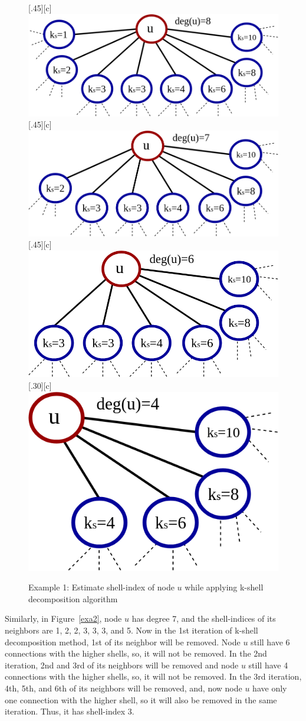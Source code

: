 \documentclass[12pt,3p]{article}
\begin{document}
\begin{figure}[htp]
  \centering
  [.45\linewidth][c]{%
    \includegraphics[width=.45\linewidth]{images/kshell_example1_itr0}}\quad
  [.45\linewidth][c]{%
    \includegraphics[width=.45\linewidth]{images/kshell_example1_itr1.png}}
  [.45\linewidth][c]{%
    \includegraphics[width=.45\linewidth]{images/kshell_example1_itr2}}\quad
  [.30\linewidth][c]{%
    \includegraphics[width=.30\linewidth]{images/kshell_example1_itr3.png}}
  \caption{Example 1: Estimate shell-index of node $u$ while applying k-shell decomposition algorithm}
  \label{exa1}
\end{figure}

Similarly, in Figure~\ref{exa2}, node $u$ has degree 7, and the shell-indices of its neighbors are 1, 2, 2, 3, 3, 3, and 5. Now in the 1st iteration of k-shell decomposition method, 1st of its neighbor will be removed. Node $u$ still have 6 connections with the higher shells, so, it will not be removed. In the 2nd iteration, 2nd and 3rd of its neighbors will be removed and node $u$ still have 4 connections with the higher shells, so, it will not be removed. In the 3rd iteration, 4th, 5th, and 6th of its neighbors will be removed, and, now node $u$ have only one connection with the higher shell, so it will also be removed in the same iteration. Thus, it has shell-index 3.
\end{document}
